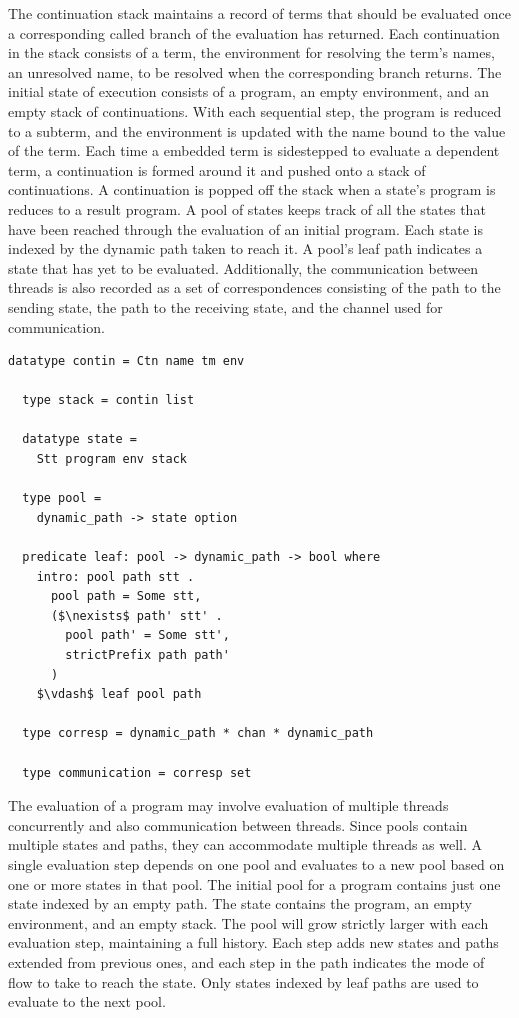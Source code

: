 \documentclass[letterpaper, 11pt]{extarticle}
\begin{document}
The continuation stack maintains a record of terms that should be evaluated
once a corresponding called branch of the evaluation has returned.
Each continuation in the stack consists of a term, the environment for resolving the
term's names, an unresolved name, to be resolved when the corresponding branch returns. 
The initial state of execution consists of a program, an empty environment, and an empty stack
of continuations. With each sequential step, the program is reduced to a subterm,
and the environment is updated with the name bound to the value of the term. Each time a
embedded term is sidestepped to evaluate a dependent term, a continuation is formed around
it and pushed onto a stack of continuations. A continuation is popped off the stack when a
state's program is reduces to a result program.  A pool of states keeps track of all the states
that have been reached through the evaluation of an initial program.  Each state is indexed by
the dynamic path taken to reach it. A pool's leaf path indicates a state that has yet to be
evaluated. Additionally, the communication between threads is also recorded as a set of
correspondences consisting of the path to the sending state, the path to the receiving state,
and the channel used for communication.

\begin{lstlisting}[language=logic, mathescape]
  datatype contin = Ctn name tm env

  type stack = contin list

  datatype state =
    Stt program env stack 

  type pool =
    dynamic_path -> state option

  predicate leaf: pool -> dynamic_path -> bool where
    intro: pool path stt .
      pool path = Some stt,
      ($\nexists$ path' stt' .
        pool path' = Some stt',
        strictPrefix path path'
      )
    $\vdash$ leaf pool path

  type corresp = dynamic_path * chan * dynamic_path

  type communication = corresp set 
\end{lstlisting}

The evaluation of a program may involve evaluation of multiple threads concurrently and also
communication between threads. Since pools contain multiple states and paths, they can
accommodate multiple threads as well.  A single evaluation step depends on one pool and
evaluates to a new pool based on one or more states in that pool. The initial pool for a
program contains just one state indexed by an empty path. The state contains the program, an
empty environment, and an empty stack. The pool will grow strictly larger with each evaluation
step, maintaining a full history. Each step adds new states and paths extended from previous
ones, and each step in the path indicates the mode of flow to take to reach the state.
Only states indexed by leaf paths are used to evaluate to the next pool.
\end{document}
